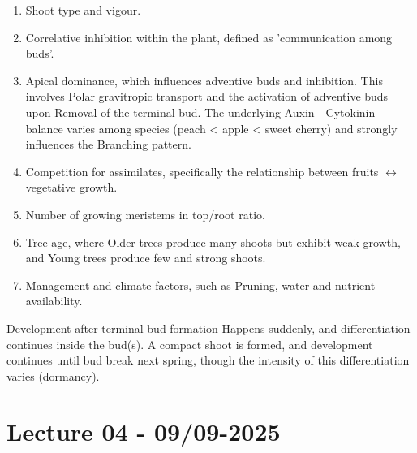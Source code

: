 \begin{enumerate} 
    \item Shoot type and vigour. 
    \item Correlative inhibition within the plant, defined as 'communication among buds'. 
    \item Apical dominance, which influences adventive buds and inhibition. This involves Polar gravitropic transport and the activation of adventive buds upon Removal of the terminal bud. The underlying Auxin - Cytokinin balance varies among species (peach < apple < sweet cherry) and strongly influences the Branching pattern. 
    \item Competition for assimilates, specifically the relationship between fruits $\leftrightarrow$ vegetative growth. 
    \item Number of growing meristems in top/root ratio. 
    \item Tree age, where Older trees produce many shoots but exhibit weak growth, and Young trees produce few and strong shoots. 
    \item Management and climate factors, such as Pruning, water and nutrient availability. 
\end{enumerate} 

Development after terminal bud formation Happens suddenly, and differentiation continues inside the bud(s). A compact shoot is formed, and development continues until bud break next spring, though the intensity of this differentiation varies (dormancy).

\section{Lecture 04 - 09/09-2025}
